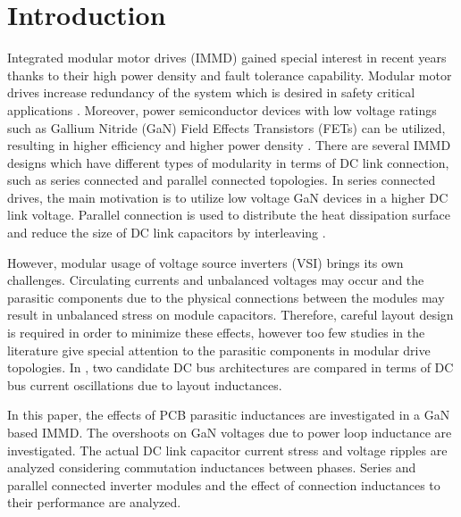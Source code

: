 \section{Introduction}\label{sec:Intro}
Integrated modular motor drives (IMMD) gained special interest in recent years thanks to their high power density and fault tolerance capability. Modular motor drives increase redundancy of the system which is desired in safety critical applications \cite{Zhang2017}. Moreover, power semiconductor devices with low voltage ratings such as Gallium Nitride (GaN) Field Effects Transistors (FETs) can be utilized, resulting in higher efficiency and higher power density \cite{Wang2015b}. There are several IMMD designs which have different types of modularity in terms of DC link connection, such as series connected \cite{Wang2015b} and parallel connected \cite{Zhang2017,Su2010} topologies. In series connected drives, the main motivation is to utilize low voltage GaN devices in a higher DC link voltage. Parallel connection is used to distribute the heat dissipation surface and reduce the size of DC link capacitors by interleaving \cite{Ugur2017}.

However, modular usage of voltage source inverters (VSI) brings its own challenges. Circulating currents and unbalanced voltages may occur and the parasitic components due to the physical connections between the modules may result in unbalanced stress on module capacitors. Therefore, careful layout design is required in order to minimize these effects, however too few studies in the literature give special attention to the parasitic components in modular drive topologies. In \cite{Brown2007}, two candidate DC bus architectures are compared in terms of DC bus current oscillations due to layout inductances.

In this paper, the effects of PCB parasitic inductances are investigated in a GaN based IMMD. The overshoots on GaN voltages due to power loop inductance are investigated. The actual DC link capacitor current stress and voltage ripples are analyzed considering commutation inductances between phases. Series and parallel connected inverter modules and the effect of connection inductances to their performance are analyzed.


